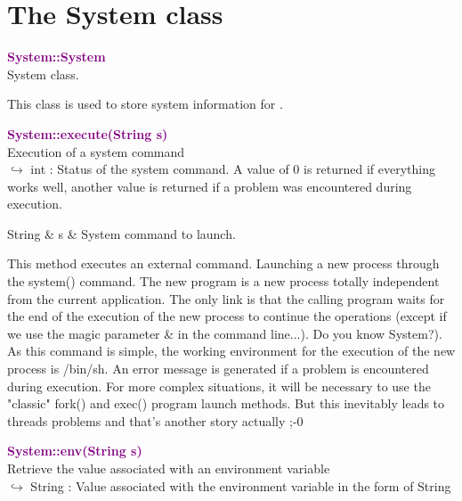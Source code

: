 
\section{The System class}

\textcolor{purple}{\textbf{System::System}}\label{System::System}\\
System class.

This class is used to store system information for \DynELA.

\textcolor{purple}{\textbf{System::execute(String s)}}\label{System::execute(String s)}\\
Execution of a system command\\ \hspace*{10mm}$\hookrightarrow$ int : Status of the system command. A value of 0 is returned if everything works well, another value is returned if a problem was encountered during execution.

\begin{tcolorbox}[width=\textwidth,myArgs,tabularx={ll|R}]
String & s & System command to launch.
\end{tcolorbox}

This method executes an external command. Launching a new process through the system() command.
The new program is a new process totally independent from the current application.
The only link is that the calling program waits for the end of the execution of the new process to continue the operations (except if we use the magic parameter \& in the command line...).
Do you know System?). As this command is simple, the working environment for the execution of the new process is /bin/sh. An error message is generated if a problem is encountered during execution.
For more complex situations, it will be necessary to use the "classic" fork() and exec() program launch methods. But this inevitably leads to threads problems and that's another story actually ;-0

\textcolor{purple}{\textbf{System::env(String s)}}\label{System::env(String s)}\\
Retrieve the value associated with an environment variable\\ \hspace*{10mm}$\hookrightarrow$ String : Value associated with the environment variable in the form of String

